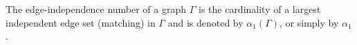 The edge-independence number of a graph $\Gamma$ is the cardinality of a largest independent edge set (matching) in $\Gamma$ and is denoted by $\alpha_1(\Gamma)$, or simply by $\alpha_1$.